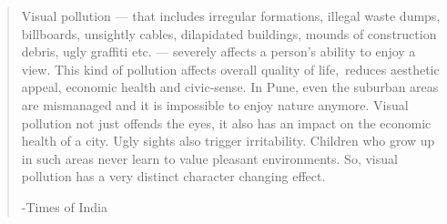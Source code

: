 \documentclass{beamer}
\begin{document}
     \begin{frame}
        \begin{quote}
            Visual pollution — that includes irregular formations, illegal waste dumps, billboards, unsightly cables, 
            dilapidated buildings, mounds of construction debris, ugly graffiti etc. — severely affects a person’s ability to 
            enjoy a view. This kind of pollution affects overall quality of life, reduces aesthetic appeal, economic health
             and civic-sense. In Pune, even the suburban areas are mismanaged and it is impossible to enjoy nature 
             anymore. Visual pollution not just offends the eyes, it also has an impact on the economic health 
             of a city. Ugly sights also trigger irritability. Children who grow up in such areas never learn to
             value pleasant environments. So, visual pollution has a very distinct character changing effect.
             
        -Times of India
        \end{quote}
     \end{frame}
    
\end{document}
